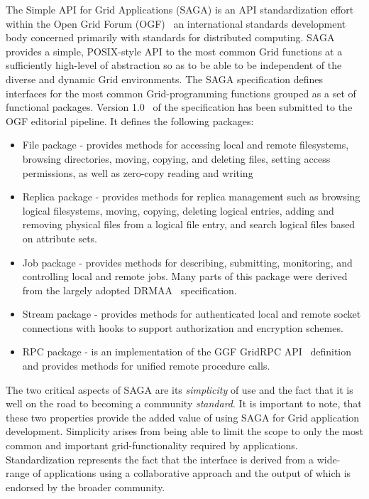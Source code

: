 \documentclass[conference,final]{IEEEtran}
\begin{document}
The Simple API for Grid Applications (SAGA) is an API standardization
effort within the Open Grid Forum (OGF)~\cite{ogf_web} an
international standards development body concerned primarily with
standards for distributed computing.  SAGA provides a simple,
POSIX-style API to the most common Grid functions at a sufficiently
high-level of abstraction so as to be able to be independent of the
diverse and dynamic Grid environments.  The SAGA specification defines
interfaces for the most common Grid-programming functions grouped as a
set of functional packages.  Version 1.0~\cite{saga-core} of the
specification has been submitted to the OGF editorial pipeline.  It
defines the following packages:

\begin{itemize}
\item File package - provides methods for accessing local and remote
  filesystems, browsing directories, moving, copying, and deleting
  files, setting access permissions, as well as zero-copy reading and
  writing
\item Replica package - provides methods for replica management such
  as browsing logical filesystems, moving, copying, deleting logical
  entries, adding and removing physical files from a logical file
  entry, and search logical files based on attribute sets.
\item Job package - provides methods for describing, submitting,
  monitoring, and controlling local and remote jobs. Many parts of
  this package were derived from the largely adopted
  DRMAA~\cite{drmaa_url} specification.
\item Stream package - provides methods for authenticated local and
  remote socket connections with hooks to support authorization and
  encryption schemes.
\item RPC package - is an implementation of the GGF GridRPC
  API~\cite{gridrpc_url} definition and provides methods for unified
  remote procedure calls.
\end{itemize}

The two critical aspects of SAGA are its {\it simplicity} of use and
the fact that it is well on the road to becoming a community {\it
  standard}.  It is important to note, that these two properties
provide the added value of using SAGA for Grid application
development.  Simplicity arises from being able to limit the scope to
only the most common and important grid-functionality required by
applications.  Standardization represents the fact that the interface
is derived from a wide-range of applications using a collaborative
approach and the output of which is endorsed by the broader community.
\end{document}
